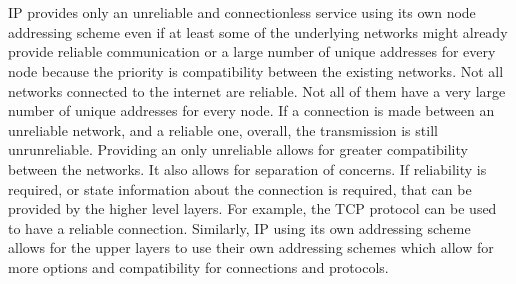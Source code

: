 \section{}
IP provides only an unreliable and connectionless service using its own node
addressing scheme even if at least some of the underlying networks might already
provide reliable communication or a large number of unique addresses for every
node because the priority is compatibility between the existing networks. Not
all networks connected to the internet are reliable. Not all of them have a very
large number of unique addresses for every node. If a connection is made between
an unreliable network, and a reliable one, overall, the transmission is still
unrunreliable. Providing an only unreliable allows for greater compatibility
between the networks. It also allows for separation of concerns. If reliability
is required, or state information about the connection is required,
that can be provided by the higher level layers. For example, the TCP protocol
can be used to have a reliable connection. Similarly, IP using its own
addressing scheme allows for the upper layers to use their own addressing
schemes which allow for more options and compatibility for connections and
protocols. 
